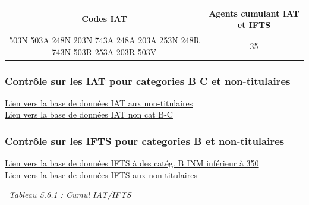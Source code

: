 \begin{longtable}[]{@{}cc@{}}
\toprule
Codes IAT & Agents cumulant IAT et IFTS\tabularnewline
\midrule
\endhead
503N 503A 248N 203N 743A 248A 203A 253N 248R 743N 503R 253A 203R 503V &
35\tabularnewline
\bottomrule
\end{longtable}

\hypertarget{controle-sur-les-iat-pour-categories-b-c-et-non-titulaires}{%
\subsubsection{Contrôle sur les IAT pour categories B C et
non-titulaires}\label{controle-sur-les-iat-pour-categories-b-c-et-non-titulaires}}

\href{../Bases/Reglementation/IAT.non.tit.csv}{Lien vers la base de données
IAT aux non-titulaires}\\
\href{../Bases/Reglementation/IAT.non.catBC.csv}{Lien vers la base de
données IAT non cat B-C}

\hypertarget{controle-sur-les-ifts-pour-categories-b-et-non-titulaires}{%
\subsubsection{Contrôle sur les IFTS pour categories B et
non-titulaires}\label{controle-sur-les-ifts-pour-categories-b-et-non-titulaires}}

\href{../Bases/Reglementation/IFTS.indice.anormal.csv}{Lien vers la base de
données IFTS à des catég. B INM inférieur à 350}\\
\href{../Bases/Reglementation/IFTS.non.tit.csv}{Lien vers la base de
données IFTS aux non-titulaires}

~\emph{Tableau 5.6.1 : Cumul IAT/IFTS}

